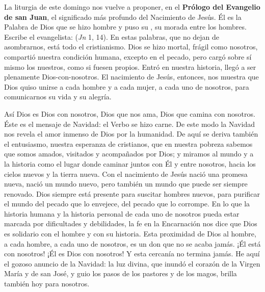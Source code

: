 				
				\begin{body}
					La liturgia de este domingo nos vuelve a proponer, en el \textbf{Prólogo del Evangelio de san Juan}, el significado más profundo del Nacimiento de Jesús. Él es la Palabra de Dios que se hizo hombre y puso su , su morada entre los hombres. Escribe el evangelista:  (\emph{Jn} 1, 14). En estas palabras, que no dejan de asombrarnos, está todo el cristianismo. Dios se hizo mortal, frágil como nosotros, compartió nuestra condición humana, excepto en el pecado, pero cargó sobre sí mismo los nuestros, como si fuesen propios. Entró en nuestra historia, llegó a ser plenamente Dios-con-nosotros. El nacimiento de Jesús, entonces, nos muestra que Dios quiso unirse a cada hombre y a cada mujer, a cada uno de nosotros, para comunicarnos su vida y su alegría.
					
					Así Dios es Dios con nosotros, Dios que nos ama, Dios que camina con nosotros. Éste es el mensaje de Navidad: el Verbo se hizo carne. De este modo la Navidad nos revela el amor inmenso de Dios por la humanidad. De aquí se deriva también el entusiasmo, nuestra esperanza de cristianos, que en nuestra pobreza sabemos que somos amados, visitados y acompañados por Dios; y miramos al mundo y a la historia como el lugar donde caminar juntos con Él y entre nosotros, hacia los cielos nuevos y la tierra nueva. Con el nacimiento de Jesús nació una promesa nueva, nació un mundo nuevo, pero también un mundo que puede ser siempre renovado. Dios siempre está presente para suscitar hombres nuevos, para purificar el mundo del pecado que lo envejece, del pecado que lo corrompe. En lo que la historia humana y la historia personal de cada uno de nosotros pueda estar marcada por dificultades y debilidades, la fe en la Encarnación nos dice que Dios es solidario con el hombre y con su historia. Esta proximidad de Dios al hombre, a cada hombre, a cada uno de nosotros, es un don que no se acaba jamás. ¡Él está con nosotros! ¡Él es Dios con nosotros! Y esta cercanía no termina jamás. He aquí el gozoso anuncio de la Navidad: la luz divina, que inundó el corazón de la Virgen María y de san José, y guio los pasos de los pastores y de los magos, brilla también hoy para nosotros.
					

\end{body}
